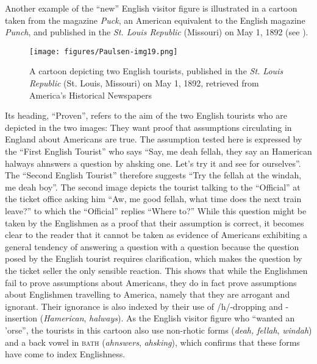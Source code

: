 Another example of the “new” English visitor figure is illustrated in a cartoon taken from the magazine \emph{Puck}, an American equivalent to the English magazine \emph{Punch}, and published in the \emph{St. Louis Republic} (Missouri) on May 1, 1892 (see ).


\begin{figure}
\texttt{[image: figures/Paulsen-img19.png]}
\caption{
A cartoon depicting two English tourists, published in the \emph{St. Louis Republic} (St. Louis, Missouri) on May 1, 1892, retrieved from America's Historical Newspapers
}
\label{fig:key:19}
\end{figure}

Its heading, “Proven”, refers to the aim of the two English tourists who are depicted in the two images: They want proof that assumptions circulating in England about Americans are true. The assumption tested here is expressed by the “First English Tourist” who says “Say, me deah fellah, they say an Hamerican halways ahnswers a question by ahsking one. Let’s try it and see for ourselves”. The “Second English Tourist” therefore suggests “Try the fellah at the windah, me deah boy”. The second image depicts the tourist talking to the “Official” at the ticket office asking him “Aw, me good fellah, what time does the next train leave?” to which the “Official” replies “Where to?” While this question might be taken by the Englishmen as a proof that their assumption is correct, it becomes clear to the reader that it cannot be taken as evidence of Americans exhibiting a general tendency of answering a question with a question because the question posed by the English tourist requires clarification, which makes the question by the ticket seller the only sensible reaction. This shows that while the Englishmen fail to prove assumptions about Americans, they do in fact prove assumptions about Englishmen travelling to America, namely that they are arrogant and ignorant. Their ignorance is also indexed by their use of /h/-dropping and -insertion (\emph{Hamerican}, \emph{halways}). As the English visitor figure who “wanted an ’orse”, the tourists in this cartoon also use non-rhotic forms (\emph{deah, fellah}, \emph{windah}) and a back vowel in \textsc{bath} (\emph{ahnswers}, \emph{ahsking}), which confirms that these forms have come to index Englishness.


